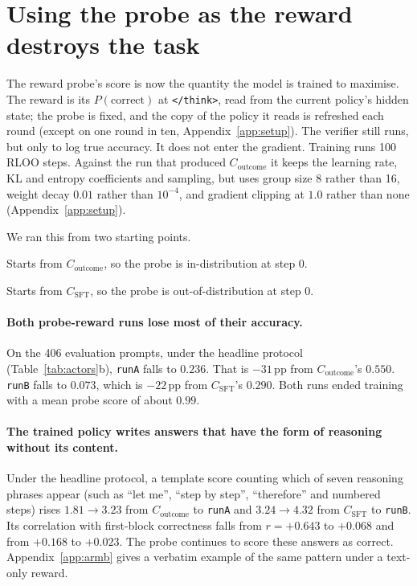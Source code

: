 \documentclass{article}
\begin{document}
\section{Using the probe as the reward destroys the task}\label{sec:probe-rl}

The reward probe's score is now the quantity the model is trained to maximise. The reward is its $P(\text{correct})$ at \texttt{</think>}, read from the current policy's hidden state; the probe is fixed, and the copy of the policy it reads is refreshed each round (except on one round in ten, Appendix~\ref{app:setup}). The verifier still runs, but only to log true accuracy. It does not enter the gradient. Training runs 100 RLOO steps. Against the run that produced $C_{\text{outcome}}$ it keeps the learning rate, KL and entropy coefficients and sampling, but uses group size 8 rather than 16, weight decay $0.01$ rather than $10^{-4}$, and gradient clipping at $1.0$ rather than none (Appendix~\ref{app:setup}).

We ran this from two starting points.
\begin{description}[leftmargin=2em,itemsep=2pt,topsep=2pt]
  \item[\texttt{runA}] Starts from $C_{\text{outcome}}$, so the probe is in-distribution at step 0.
  \item[\texttt{runB}] Starts from $C_{\text{SFT}}$, so the probe is out-of-distribution at step 0.
\end{description}

\paragraph{Both probe-reward runs lose most of their accuracy.} On the 406 evaluation prompts, under the headline protocol (Table~\ref{tab:actors}b), \texttt{runA} falls to $0.236$. That is $-31$\,pp from $C_{\text{outcome}}$'s $0.550$. \texttt{runB} falls to $0.073$, which is $-22$\,pp from $C_{\text{SFT}}$'s $0.290$. Both runs ended training with a mean probe score of about $0.99$.

\paragraph{The trained policy writes answers that have the form of reasoning without its content.} Under the headline protocol, a template score counting which of seven reasoning phrases appear (such as ``let me'', ``step by step'', ``therefore'' and numbered steps) rises $1.81 \to 3.23$ from $C_{\text{outcome}}$ to \texttt{runA} and $3.24 \to 4.32$ from $C_{\text{SFT}}$ to \texttt{runB}. Its correlation with first-block correctness falls from $r{=}{+}0.643$ to $+0.068$ and from $+0.168$ to $+0.023$. The probe continues to score these answers as correct. Appendix~\ref{app:armb} gives a verbatim example of the same pattern under a text-only reward.
\end{document}
